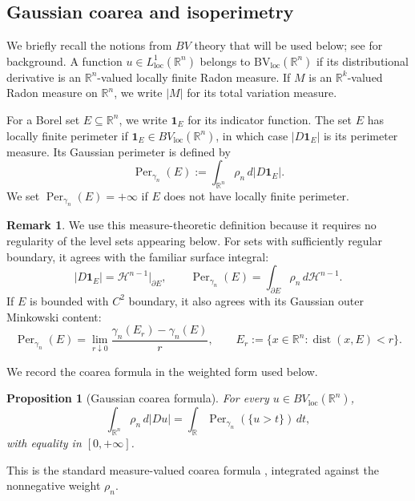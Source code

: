 \documentclass[11pt]{amsart}
\newtheorem{proposition}[proposition]{Proposition}
\theoremstyle{definition}
\newtheorem{remark}[remark]{Remark}
\newcommand{\R}{\mathbb{R}}
\newcommand{\Perg}{\operatorname{Per}_{\gamma_n}}
\newcommand{\ind}{\mathbf{1}}
\newcommand{\BVloc}{\operatorname{BV_{loc}}}
\begin{document}
\subsection{Gaussian coarea and isoperimetry}

We briefly recall the notions from $BV$ theory that will be used below;
see \cite[Chapter~3]{AmFuPa00} for background. A function $u\in L^1_{\mathrm{loc}}(\R^n)$ belongs to
$\BVloc(\R^n)$ if its distributional derivative is an
$\R^n$-valued locally finite Radon measure. If $M$ is an
$\R^k$-valued Radon measure on $\R^n$, we write $|M|$ for its total variation measure.


For a Borel set $E\subseteq\R^n$, we write $\ind_E$ for its indicator
function. The set $E$ has locally finite perimeter if
$\ind_E\in BV_{\mathrm{loc}}(\R^n)$, in which case $|D\ind_E|$ is its
perimeter measure. Its Gaussian perimeter is defined by
\[
  \Perg(E)
  :=
  \int_{\R^n}\rho_n\,d|D\ind_E|.
\]
We set $\Perg(E)=+\infty$ if $E$ does not have locally finite
perimeter.

\begin{remark}
We use this measure-theoretic definition because it requires no
regularity of the level sets appearing below. For sets with sufficiently
regular boundary, it agrees with the familiar surface integral:
\[
  |D\ind_E|
  =
  \mathcal H^{n-1}|_{\partial E},
  \qquad
  \Perg(E)
  =
  \int_{\partial E}\rho_n\,d\mathcal H^{n-1}.
\]
If $E$ is bounded with $C^2$ boundary, it also agrees with its Gaussian
outer Minkowski content:
\[
  \Perg(E)
  =
  \lim_{r\downarrow0}
  \frac{\gamma_n(E_r)-\gamma_n(E)}{r},
  \qquad
  E_r:=\{x\in\R^n:\operatorname{dist}(x,E)<r\}.
\]
\end{remark}

We record the coarea formula in the weighted form used below.

\begin{proposition}[Gaussian coarea formula]
\label{prop:gaussian-coarea}
For every $u\in BV_{\mathrm{loc}}(\R^n)$,
\[
  \int_{\R^n}\rho_n\,d|Du|
  =
  \int_\R\Perg(\{u>t\})\,dt,
\]
with equality in $[0,+\infty]$.
\end{proposition}

This is the standard measure-valued coarea formula
\cite[Theorem~3.40 and (3.63)]{AmFuPa00}, integrated against the
nonnegative weight $\rho_n$.
\end{document}
